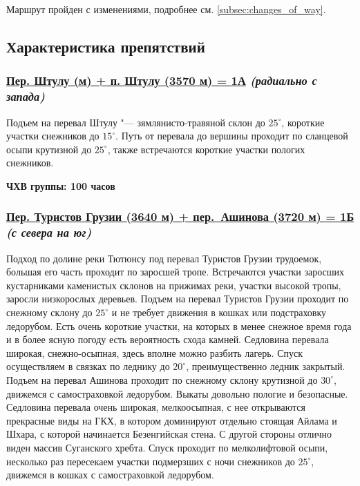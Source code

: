 		Маршрут пройден с изменениями, подробнее см. \ref{subsec:changes_of_way}.

	
	\subsection{Характеристика препятствий}\label{subsec:main_obstacles}
		\subsubsection*{%
			\hyperref[subsec:Day2]{Пер. Штулу (м) + п. Штулу (3570 м) = 1А}
			{\it (радиально с запада)}%
		}
			Подъем на перевал Штулу "--- зямлянисто-травяной склон до $25^\circ$, короткие участки снежников
			до $15^\circ$. Путь от перевала до вершины проходит по сланцевой осыпи крутизной до $25^\circ$,
			также встречаются короткие участки пологих снежников.

			{\bf ЧХВ группы: 100 часов}
		
		\subsubsection*{%
			\hyperref[subsec:Day4]{Пер. Туристов Грузии (3640 м) + пер.~Ашинова (3720 м) = 1Б}
			{\it (с севера на юг)}%
		}
			Подход по долине реки Тютюнсу под перевал Туристов Грузии трудоемок, большая его часть проходит по
			заросшей тропе. Встречаются участки заросших кустарниками каменистых склонов на прижимах реки,
			участки высокой тропы, заросли низкорослых деревьев. Подъем на перевал Туристов Грузии проходит по
			снежному склону до $25^\circ$ и не требует движения в кошках или подстраховку ледорубом. Есть очень
			короткие участки, на которых в менее снежное время года и в более ясную погоду есть вероятность
			схода камней. Седловина перевала широкая, снежно-осыпная, здесь вполне можно разбить лагерь. Спуск
			осуществляем в связках по леднику до $20^\circ$, преимущественно ледник закрытый. Подъем на перевал
			Ашинова проходит по снежному склону крутизной до $30^\circ$, движемся с самостраховкой ледорубом.
			Выкаты довольно пологие и безопасные. Седловина перевала очень широкая, мелкоосыпная, с нее
			открываются прекрасные виды на ГКХ, в котором доминируют отдельно стоящая Айлама и Шхара, с которой
			начинается Безенгийская стена. С другой стороны отлично виден массив Суганского хребта. Спуск
			проходит по мелколифтовой осыпи, несколько раз пересекаем участки подмерзших с ночи снежников
			до $25^\circ$, движемся в кошках с самостраховкой ледорубом.
		
